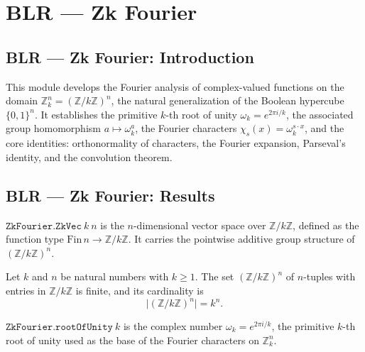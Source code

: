 \section{BLR --- Zk Fourier}
\subsection*{BLR --- Zk Fourier: Introduction}

This module develops the Fourier analysis of complex-valued functions on the
domain $\mathbb{Z}_k^n = (\mathbb{Z}/k\mathbb{Z})^n$, the natural
generalization of the Boolean hypercube $\{0,1\}^n$.  It establishes the
primitive $k$-th root of unity $\omega_k = e^{2\pi i/k}$, the associated
group homomorphism $a \mapsto \omega_k^a$, the Fourier characters
$\chi_s(x) = \omega_k^{s \cdot x}$, and the core identities: orthonormality
of characters, the Fourier expansion, Parseval's identity, and the convolution
theorem.

\subsection*{BLR --- Zk Fourier: Results}

\begin{definition}
\label{ZkFourier.ZkVec}
\leanok
$\texttt{ZkFourier.ZkVec}\ k\ n$ is the $n$-dimensional vector space over
$\mathbb{Z}/k\mathbb{Z}$, defined as the function type
$\mathrm{Fin}\,n \to \mathbb{Z}/k\mathbb{Z}$.  It carries the pointwise
additive group structure of $(\mathbb{Z}/k\mathbb{Z})^n$.
\end{definition}

\begin{lemma}
\label{ZkFourier.card_ZkVec}
\leanok
{}
Let $k$ and $n$ be natural numbers with $k \ge 1$. The set $(\mathbb{Z}/k\mathbb{Z})^n$
of $n$-tuples with entries in $\mathbb{Z}/k\mathbb{Z}$ is finite, and its cardinality is
\[
\bigl|(\mathbb{Z}/k\mathbb{Z})^n\bigr| = k^n.
\]
\end{lemma}

\begin{definition}
\label{ZkFourier.rootOfUnity}
\leanok
{}
$\texttt{ZkFourier.rootOfUnity}\ k$ is the complex number
$\omega_k = e^{2\pi i / k}$, the primitive $k$-th root of unity used as the
base of the Fourier characters on $\mathbb{Z}_k^n$.
\end{definition}

